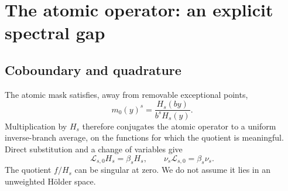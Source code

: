\documentclass[11pt,a4paper]{article}
\numberwithin{equation}{section}
\theoremstyle{definition}
\theoremstyle{remark}
\newcommand{\Lop}{\mathcal L}
\begin{document}
\section{The atomic operator: an explicit spectral gap}
\label{sec:gap}

\subsection{Coboundary and quadrature}
The atomic mask satisfies, away from removable exceptional points,
\begin{equation}
 m_0(y)^s=\frac{H_s(by)}{b^sH_s(y)}.
 \label{eq:coboundary}
\end{equation}
Multiplication by $H_s$ therefore conjugates the atomic operator to a
uniform inverse-branch average, on the functions for which the quotient
is meaningful. Direct substitution and a change of variables give
\begin{equation}
 \Lop_{s,0}H_s=\beta_sH_s,
 \qquad \nu_s\Lop_{s,0}=\beta_s\nu_s.
 \label{eq:eigenpair}
\end{equation}
The quotient $f/H_s$ can be singular at zero. We do not assume it lies
in an unweighted H\"older space.
\end{document}
